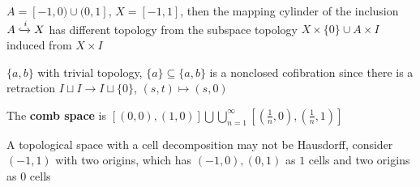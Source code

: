 \documentclass[main]{subfiles}
\begin{document}
\begin{example}\label{Mapping cylinder of inclusion may have different topology then induced subspace topology}
$A=[-1,0)\cup(0,1]$, $X=[-1,1]$, then the mapping cylinder of the inclusion $A\xhookrightarrow{i}X$ has different topology from the subspace topology $X\times\{0\}\cup A\times I$ induced from $X\times I$
\begin{center}
\end{center}
\end{example}

\begin{example}\label{Nonclosed cofibration}
$\{a,b\}$ with trivial topology, $\{a\}\subseteq\{a,b\}$ is a nonclosed cofibration since there is a retraction $I\sqcup I\to I\sqcup\{0\}$, $(s,t)\mapsto(s,0)$
\end{example}

\begin{example}
The \textbf{comb space} is $[(0,0),(1,0)]\bigcup\bigcup_{n=1}^\infty[(\frac{1}{n},0),(\frac{1}{n},1)]$
\begin{center}
\end{center}
\end{example}

\begin{example}\label{A line with two origins}
A topological space with a cell decomposition may not be Hausdorff, consider $(-1,1)$ with two origins, which has $(-1,0),(0,1)$ as $1$ cells and two origins as $0$ cells
\begin{center}
\end{center}
\end{example}
\end{document}
